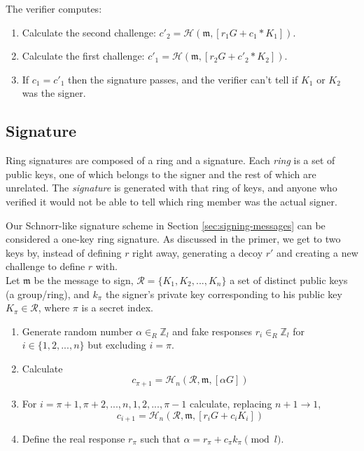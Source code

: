 The verifier computes:

\begin{enumerate}
	\item Calculate the second challenge: \(c'_2 = \mathcal{H}(\mathfrak{m},[r_1 G + c_1*K_1])\).

    \item Calculate the first challenge: \(c'_1 = \mathcal{H}(\mathfrak{m},[r_2 G + c'_2*K_2])\).

	\item If $c_1 = c'_1$ then the signature passes, and the verifier can't tell if $K_1$ or $K_2$ was the signer.
\end{enumerate}


\subsection*{Signature}

Ring signatures are composed of a ring and a signature. Each {\em ring} is a set of public keys, one of which belongs to the signer and the rest of which are unrelated. The {\em signature} is generated with that ring of keys, and anyone who verified it would not be able to tell which ring member was the actual signer.

Our Schnorr-like signature scheme in Section \ref{sec:signing-messages} can be considered a one-key ring signature. As discussed in the primer, we get to two keys by, instead of defining $r$ right away, generating a decoy $r'$ and creating a new challenge to define $r$ with.
\\

Let \(\mathfrak{m}\) be the message to sign, \(\mathcal{R} = \{K_1, K_2, ..., K_n\}\) a set of distinct public keys (a group/ring), and \(k_\pi\) the signer's private key corresponding to his public key \(K_\pi \in \mathcal{R}\), where $\pi$ is a secret index.

\begin{enumerate}
	\item Generate random number \(\alpha \in_R \mathbb{Z}_l\) and fake responses  \(r_i \in_R \mathbb{Z}_l\) for \(i \in \{1, 2, ..., n\}\) but excluding \(i = \pi\).

	\item Calculate%
	\[c_{\pi+1} = \mathcal{H}_n(\mathcal{R}, \mathfrak{m}, [\alpha G])\]

	\item For \(i = \pi+1, \pi+2, ..., n, 1, 2, ..., \pi-1\) calculate, replacing \(n + 1 \rightarrow 1\),\vspace{.175cm}
	\[  c_{i+1} = \mathcal{H}_n(\mathcal{R}, \mathfrak{m}, [r_i G + c_i K_i])\] 

	\item Define the real response $r_\pi$ such that \(\alpha = r_\pi + c_\pi k_\pi \pmod l\).
\end{enumerate}


